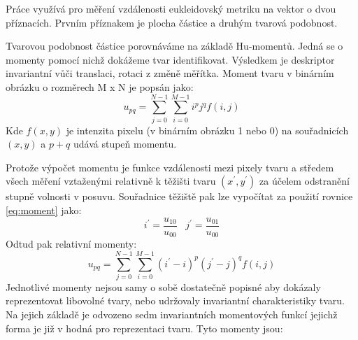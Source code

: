 \documentclass[11pt,twoside,a4paper,table]{book}
\begin{document}
Práce využívá pro měření vzdálenosti eukleidovský metriku na vektor o dvou příznacích. Prvním příznakem je plocha částice a druhým tvarová podobnost.

Tvarovou podobnost částice porovnáváme na základě Hu-momentů\citep{art:hu_moments}. Jedná se o momenty pomocí nichž dokážeme tvar identifikovat. Výsledkem je deskriptor invariantní vůči translaci, rotaci z změně měřítka. Moment tvaru v binárním obrázku o rozměrech M x N je popsán jako:
\begin{equation}
u_{pq} = \sum^{N-1}_{j=0}\sum^{M-1}_{i=0} i^p j^q f(i,j)
\label{eq:moment}
\end{equation}
Kde $f(x,y)$ je intenzita pixelu (v binárním obrázku 1 nebo 0) na souřadnicích $(x,y)$ a $p+q$ udává stupeň momentu.

Protože výpočet momentu je funkce vzdálenosti mezi pixely tvaru a středem všech měření vztaženými relativně k těžišti tvaru $(x^\prime, y^\prime)$  za účelem odstranění stupně volnosti v posuvu. Souřadnice těžiště pak lze vypočítat za použití rovnice \ref{eq:moment} jako:
\begin{equation}
i^\prime = \frac{u_{10}}{u_{00}} \,\,\,\,\, j^\prime = \frac{u_{01}}{u_{00}}
\end{equation}
Odtud pak relativní momenty:
\begin{equation}
u_{pq} = \sum^{N-1}_{j=0}\sum^{M-1}_{i=0} (i^\prime - i)^p (j^\prime -j)^q f(i,j)
\end{equation}
Jednotlivé momenty nejsou samy o sobě dostatečně popisné aby dokázaly reprezentovat libovolné tvary, nebo udržovaly invariantní charakteristiky tvaru. Na jejich základě je odvozeno sedm invariantních momentových funkcí jejichž forma je již v hodná pro reprezentaci tvaru. Tyto momenty jsou:
\end{document}
